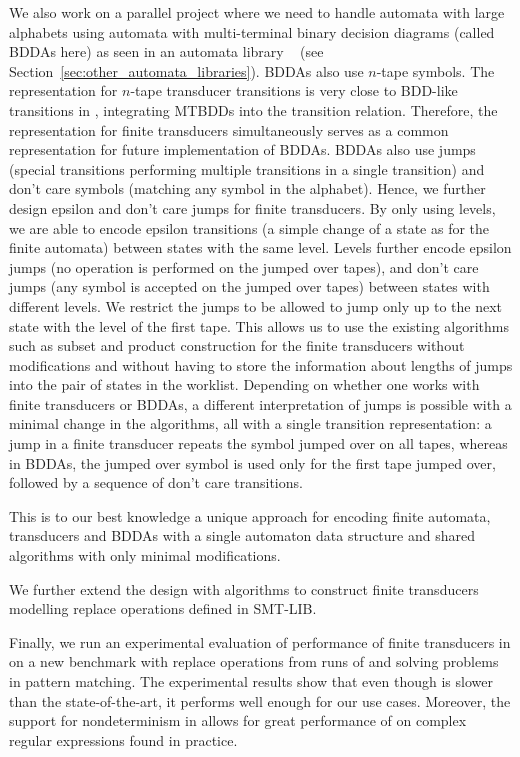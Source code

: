 We also work on a parallel project where we need to handle automata with large alphabets using automata with multi-terminal binary decision diagrams (called BDDAs here) as seen in an automata library \mona~\cite{mona} (see Section~\ref{sec:other_automata_libraries}).
BDDAs also use $n$-tape symbols.
The representation for $n$-tape transducer transitions is very close to BDD-like transitions in \mona, integrating MTBDDs into the transition relation.
Therefore, the representation for finite transducers simultaneously serves as a common representation for future implementation of BDDAs.
BDDAs also use jumps (special transitions performing multiple transitions in a single transition) and don't care symbols (matching any symbol in the alphabet).
Hence, we further design epsilon and don't care jumps for finite transducers.
By only using levels, we are able to encode epsilon transitions (a simple change of a state as for the finite automata) between states with the same level. Levels further encode epsilon jumps (no operation is performed on the jumped over tapes), and don't care jumps (any symbol is accepted on the jumped over tapes) between states with different levels.
We restrict the jumps to be allowed to jump only up to the next state with the level of the first tape.
This allows us to use the existing algorithms such as subset and product construction for the finite transducers without modifications and without having to store the information about lengths of jumps into the pair of states in the worklist.
Depending on whether one works with finite transducers or BDDAs, a different interpretation of jumps is possible with a minimal change in the algorithms, all with a single transition representation: a jump in a finite transducer repeats the symbol jumped over on all tapes, whereas in BDDAs, the jumped over symbol is used only for the first tape jumped over, followed by a sequence of don't care transitions.

This is to our best knowledge a unique approach for encoding finite automata, transducers and BDDAs with a single automaton data structure and shared algorithms with only minimal modifications.

We further extend the design with algorithms to construct finite transducers modelling replace operations defined in SMT-LIB.

Finally, we run an experimental evaluation of performance of finite transducers in \mata on a new benchmark with replace operations from runs of \noodler and solving problems in pattern matching.
The experimental results show that even though \mata is slower than the state-of-the-art, it performs well enough for our use cases.
Moreover, the support for nondeterminism in \mata allows for great performance of \nfts on complex regular expressions found in practice.

